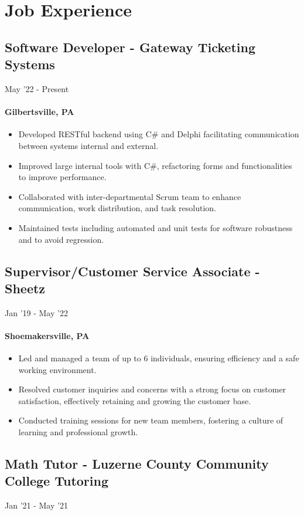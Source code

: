 \documentclass{article}
\begin{document}
\section{Job Experience}
\subsection{Software Developer - Gateway Ticketing Systems} \hfill May '22 - Present
\paragraph{Gilbertsville, PA}

\begin{itemize}
  \itemsep0em 
  \item Developed RESTful backend using C\# and Delphi facilitating communication between systems internal and external.
  \item Improved large internal tools with C\#, refactoring forms and functionalities to improve performance.
  \item Collaborated with inter-departmental Scrum team to enhance communication, work distribution, and task resolution.
  \item Maintained tests including automated and unit tests for software robustness and to avoid regression.
\end{itemize}

\subsection{Supervisor/Customer Service Associate - Sheetz} \hfill Jan '19 - May '22
\paragraph{Shoemakersville, PA}
\begin{itemize}
  \itemsep0em 
  \item Led and managed a team of up to 6 individuals, ensuring efficiency and a safe working environment.
  \item Resolved customer inquiries and concerns with a strong focus on customer satisfaction, effectively retaining and growing the customer base.
  \item Conducted training sessions for new team members, fostering a culture of learning and professional growth.
\end{itemize}

\subsection{Math Tutor - Luzerne County Community College Tutoring} \hfill Jan '21 - May '21
\end{document}
